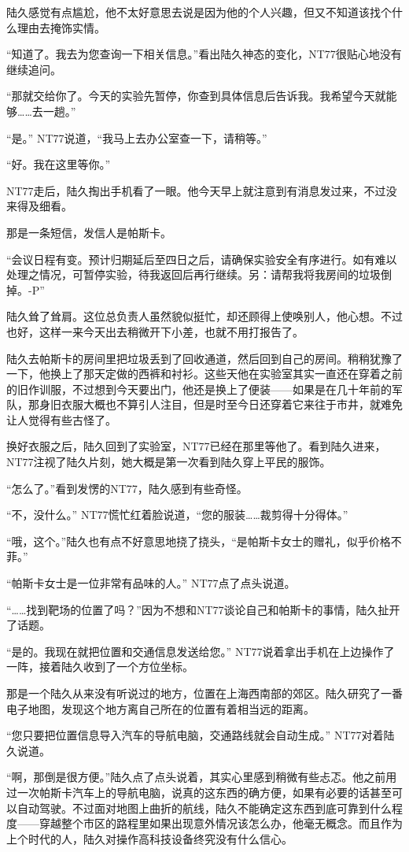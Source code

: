 陆久感觉有点尴尬，他不太好意思去说是因为他的个人兴趣，但又不知道该找个什么理由去掩饰实情。

“知道了。我去为您查询一下相关信息。”看出陆久神态的变化，NT77很贴心地没有继续追问。

“那就交给你了。今天的实验先暂停，你查到具体信息后告诉我。我希望今天就能够……去一趟。”

“是。” NT77说道，“我马上去办公室查一下，请稍等。”

“好。我在这里等你。”

NT77走后，陆久掏出手机看了一眼。他今天早上就注意到有消息发过来，不过没来得及细看。

那是一条短信，发信人是帕斯卡。

“会议日程有变。预计归期延后至四日之后，请确保实验安全有序进行。如有难以处理之情况，可暂停实验，待我返回后再行继续。另：请帮我将我房间的垃圾倒掉。-P”

陆久耸了耸肩。这位总负责人虽然貌似挺忙，却还顾得上使唤别人，他心想。不过也好，这样一来今天出去稍微开下小差，也就不用打报告了。

陆久去帕斯卡的房间里把垃圾丢到了回收通道，然后回到自己的房间。稍稍犹豫了一下，他换上了那天定做的西裤和衬衫。这些天他在实验室其实一直还在穿着之前的旧作训服，不过想到今天要出门，他还是换上了便装——如果是在几十年前的军队，那身旧衣服大概也不算引人注目，但是时至今日还穿着它来往于市井，就难免让人觉得有些古怪了。

换好衣服之后，陆久回到了实验室，NT77已经在那里等他了。看到陆久进来，NT77注视了陆久片刻，她大概是第一次看到陆久穿上平民的服饰。

“怎么了。”看到发愣的NT77，陆久感到有些奇怪。

“不，没什么。” NT77慌忙红着脸说道，“您的服装……裁剪得十分得体。”

“哦，这个。”陆久也有点不好意思地挠了挠头，“是帕斯卡女士的赠礼，似乎价格不菲。”

“帕斯卡女士是一位非常有品味的人。” NT77点了点头说道。

“……找到靶场的位置了吗？”因为不想和NT77谈论自己和帕斯卡的事情，陆久扯开了话题。

“是的。我现在就把位置和交通信息发送给您。” NT77说着拿出手机在上边操作了一阵，接着陆久收到了一个方位坐标。

那是一个陆久从来没有听说过的地方，位置在上海西南部的郊区。陆久研究了一番电子地图，发现这个地方离自己所在的位置有着相当远的距离。

“您只要把位置信息导入汽车的导航电脑，交通路线就会自动生成。” NT77对着陆久说道。

“啊，那倒是很方便。”陆久点了点头说着，其实心里感到稍微有些忐忑。他之前用过一次帕斯卡汽车上的导航电脑，说真的这东西的确方便，如果有必要的话甚至可以自动驾驶。不过面对地图上曲折的航线，陆久不能确定这东西到底可靠到什么程度——穿越整个市区的路程里如果出现意外情况该怎么办，他毫无概念。而且作为上个时代的人，陆久对操作高科技设备终究没有什么信心。

